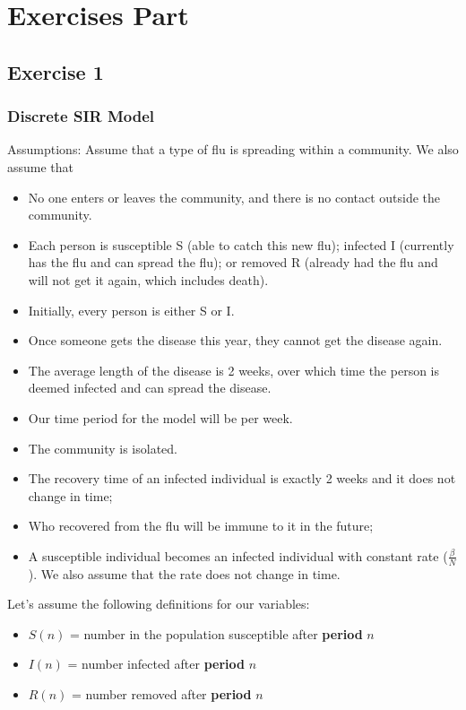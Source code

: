 \documentclass[a4paper]{article}
\begin{document}
\section{Exercises Part}
    \subsection{Exercise 1}
    \subsubsection{Discrete SIR Model}
        Assumptions: Assume that a type of flu is spreading within a community. We also assume that
        \begin{itemize}
            \item No one enters or leaves the community, and there is no contact outside the community.
            \item Each person is susceptible S (able to catch this new flu); infected I (currently has the flu and can spread the flu); or removed R (already had the flu and will not get it again, which includes death).
            \item Initially, every person is either S or I.
            \item Once someone gets the disease this year, they cannot get the disease again.
            \item The average length of the disease is 2 weeks, over which time the person is deemed infected and can spread the disease.
            \item Our time period for the model will be per week.
            \item The community is isolated.
            \item The recovery time of an infected individual is exactly 2 weeks and it does not change in time;
            \item Who recovered from the flu will be immune to it in the future;
            \item A susceptible individual becomes an infected individual with constant rate  ($\frac{\beta}{N}$). We also assume that the rate does not change in time.
        \end{itemize}
        Let’s assume the following definitions for our variables:
        \begin{itemize}
            \item $S(n)$ = number in the population susceptible after \textbf{period} $n$
            \item $I(n)$ =  number infected after \textbf{period} $n$
            \item $R(n)$ = number removed after \textbf{period} $n$
        \end{itemize}
        
\end{document}
